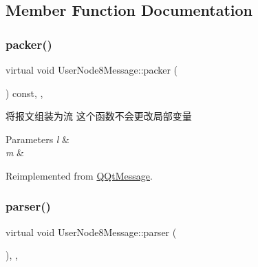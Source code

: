 \subsection{Member Function Documentation}
\mbox{\label{class_user_node8_message_ad68abcd51517e7398ef28acf37eae9eb}} 
\subsubsection{\texorpdfstring{packer()}{packer()}}
{\footnotesize\ttfamily virtual void User\+Node8\+Message\+::packer (\begin{DoxyParamCaption}\item[{Q\+Byte\+Array \&}]{ }\end{DoxyParamCaption}) const\hspace{0.3cm}{\ttfamily [inline]}, {\ttfamily [override]}, {\ttfamily [virtual]}}



将报文组装为流 这个函数不会更改局部变量 


\begin{DoxyParams}{Parameters}
{\em l} & \\
\hline
{\em m} & \\
\hline
\end{DoxyParams}


Reimplemented from \mbox{\hyperlink{class_q_qt_message_af1885c2c3628495808dca66ee8d72e14}{Q\+Qt\+Message}}.

\mbox{\label{class_user_node8_message_ab81bccac765fc5b01864f4c9fb1aca18}} 
\subsubsection{\texorpdfstring{parser()}{parser()}}
{\footnotesize\ttfamily virtual void User\+Node8\+Message\+::parser (\begin{DoxyParamCaption}\item[{const Q\+Byte\+Array \&}]{ }\end{DoxyParamCaption})\hspace{0.3cm}{\ttfamily [inline]}, {\ttfamily [override]}, {\ttfamily [virtual]}}



